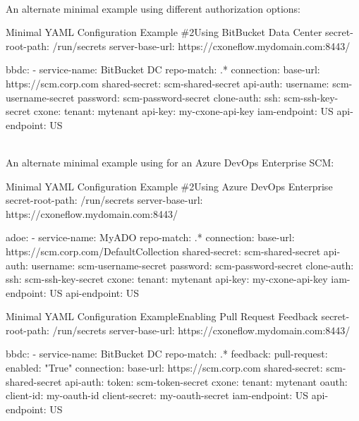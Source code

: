 \pagebreak
\noindent\\An alternate minimal example using different authorization options:

\begin{code}{Minimal YAML Configuration Example \#2}{Using BitBucket Data Center}{}
secret-root-path: /run/secrets
server-base-url: https://cxoneflow.mydomain.com:8443/

bbdc:
    - service-name: BitBucket DC
      repo-match: .*
      connection:
      base-url: https://scm.corp.com
      shared-secret: scm-shared-secret
      api-auth:
          username: scm-username-secret
          password: scm-password-secret
      clone-auth:
          ssh: scm-ssh-key-secret
      cxone:
        tenant: mytenant
        api-key: my-cxone-api-key
        iam-endpoint: US
        api-endpoint: US
\end{code}
    
\pagebreak
\noindent\\An alternate minimal example using for an Azure DevOps Enterprise
SCM:

\begin{code}{Minimal YAML Configuration Example \#2}{Using Azure DevOps Enterprise}{}
secret-root-path: /run/secrets
server-base-url: https://cxoneflow.mydomain.com:8443/

adoe:
    - service-name: MyADO
      repo-match: .*
      connection:
      base-url: https://scm.corp.com/DefaultCollection
      shared-secret: scm-shared-secret
      api-auth:
          username: scm-username-secret
          password: scm-password-secret
      clone-auth:
          ssh: scm-ssh-key-secret
      cxone:
        tenant: mytenant
        api-key: my-cxone-api-key
        iam-endpoint: US
        api-endpoint: US
\end{code}


\begin{code}{Minimal YAML Configuration Example}{Enabling Pull Request Feedback}{}
    secret-root-path: /run/secrets
    server-base-url: https://cxoneflow.mydomain.com:8443/

    bbdc:
        - service-name: BitBucket DC
          repo-match: .*
          feedback:
            pull-request:
              enabled: "True"
          connection:
            base-url: https://scm.corp.com
            shared-secret: scm-shared-secret
            api-auth:
                token: scm-token-secret
          cxone:
            tenant: mytenant
            oauth:
                client-id: my-oauth-id
                client-secret: my-oauth-secret
            iam-endpoint: US
            api-endpoint: US
    \end{code}
    